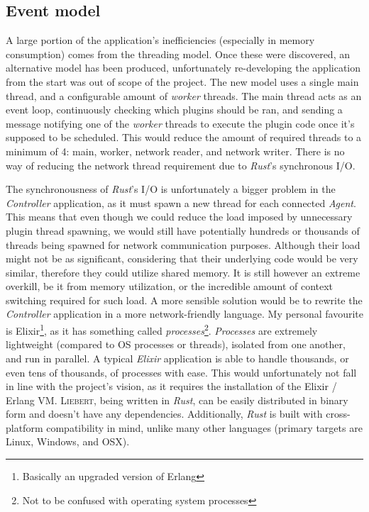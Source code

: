     \subsection{Event model}
        A large portion of the application's inefficiencies (especially in memory consumption) comes from the threading model. Once these were discovered, an alternative model has been produced, unfortunately re-developing the application from the start was out of scope of the project. The new model uses a single main thread, and a configurable amount of \textit{worker} threads. The main thread acts as an event loop, continuously checking which plugins should be ran, and sending a message notifying one of the \textit{worker} threads to execute the plugin code once it's supposed to be scheduled. This would reduce the amount of required threads to a minimum of 4: main, worker, network reader, and network writer. There is no way of reducing the network thread requirement due to \textit{Rust}'s synchronous I/O.
        
        The synchronousness of \textit{Rust}'s I/O is unfortunately a bigger problem in the \textit{Controller} application, as it must spawn a new thread for each connected \textit{Agent}. This means that even though we could reduce the load imposed by unnecessary plugin thread spawning, we would still have potentially hundreds or thousands of threads being spawned for network communication purposes. Although their load might not be as significant, considering that their underlying code would be very similar, therefore they could utilize shared memory. It is still however an extreme overkill, be it from memory utilization, or the incredible amount of context switching required for such load. A more sensible solution would be to rewrite the \textit{Controller} application in a more network-friendly language. My personal favourite is Elixir\footnote{Basically an upgraded version of Erlang}, as it has something called \textit{processes}\footnote{Not to be confused with operating system processes}. \textit{Processes} are extremely lightweight (compared to OS processes or threads), isolated from one another, and run in parallel. A typical \textit{Elixir} application is able to handle thousands, or even tens of thousands, of processes with ease. This would unfortunately not fall in line with the project's vision, as it requires the installation of the Elixir / Erlang VM. \textsc{Liebert}, being written in \textit{Rust}, can be easily distributed in binary form and doesn't have any dependencies. Additionally, \textit{Rust} is built with cross-platform compatibility in mind, unlike many other languages (primary targets are Linux, Windows, and OSX).
        
